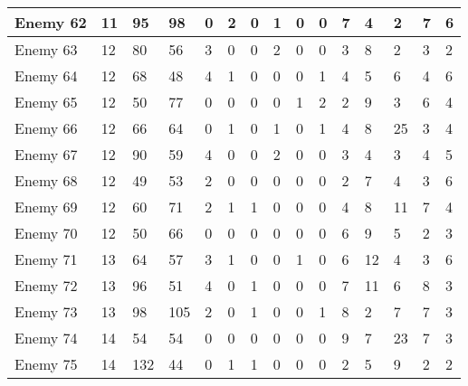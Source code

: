 \begin{sidewaystable}[!h]
{\begin{tabular}{|l|l|l|l|l|l|l|l|l|l|l|l|l|l|l|}
			Enemy 62 & 11 & 95 & 98 & 0 & 2 & 0 & 1 & 0 & 0 & 7 & 4 & 2 & 7 & 6 \\ \hline
			Enemy 63 & 12 & 80 & 56 & 3 & 0 & 0 & 2 & 0 & 0 & 3 & 8 & 2 & 3 & 2 \\ \hline
			Enemy 64 & 12 & 68 & 48 & 4 & 1 & 0 & 0 & 0 & 1 & 4 & 5 & 6 & 4 & 6 \\ \hline
			Enemy 65 & 12 & 50 & 77 & 0 & 0 & 0 & 0 & 1 & 2 & 2 & 9 & 3 & 6 & 4 \\ \hline
			Enemy 66 & 12 & 66 & 64 & 0 & 1 & 0 & 1 & 0 & 1 & 4 & 8 & 25 & 3 & 4 \\ \hline
			Enemy 67 & 12 & 90 & 59 & 4 & 0 & 0 & 2 & 0 & 0 & 3 & 4 & 3 & 4 & 5 \\ \hline
			Enemy 68 & 12 & 49 & 53 & 2 & 0 & 0 & 0 & 0 & 0 & 2 & 7 & 4 & 3 & 6 \\ \hline
			Enemy 69 & 12 & 60 & 71 & 2 & 1 & 1 & 0 & 0 & 0 & 4 & 8 & 11 & 7 & 4 \\ \hline
			Enemy 70 & 12 & 50 & 66 & 0 & 0 & 0 & 0 & 0 & 0 & 6 & 9 & 5 & 2 & 3 \\ \hline
			Enemy 71 & 13 & 64 & 57 & 3 & 1 & 0 & 0 & 1 & 0 & 6 & 12 & 4 & 3 & 6 \\ \hline
			Enemy 72 & 13 & 96 & 51 & 4 & 0 & 1 & 0 & 0 & 0 & 7 & 11 & 6 & 8 & 3 \\ \hline
			Enemy 73 & 13 & 98 & 105 & 2 & 0 & 1 & 0 & 0 & 1 & 8 & 2 & 7 & 7 & 3 \\ \hline
			Enemy 74 & 14 & 54 & 54 & 0 & 0 & 0 & 0 & 0 & 0 & 9 & 7 & 23 & 7 & 3 \\ \hline
			Enemy 75 & 14 & 132 & 44 & 0 & 1 & 1 & 0 & 0 & 0 & 2 & 5 & 9 & 2 & 2 \\ \hline
		\end{tabular}%
	}
\end{sidewaystable}
\clearpage


